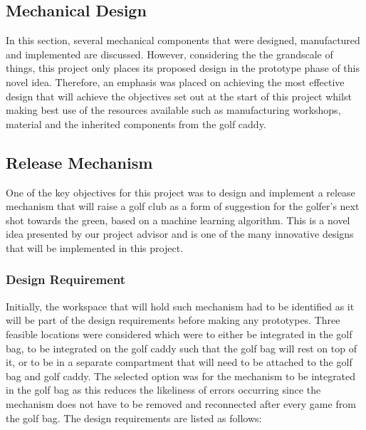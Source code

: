 \documentclass[11pt,landscape]{article}
\begin{document}
\begin{multicols}{2}


    \newpage
    
\section{Mechanical Design}
    In this section, several mechanical components that were designed,
    manufactured and implemented are discussed. However, considering the the
    grandscale of things, this project only places its proposed design in the
    prototype phase of this novel idea. Therefore, an emphasis was placed on
    achieving the most effective design that will achieve the objectives set out
    at the start of this project whilst making best use of the resources
    available such as manufacturing workshops, material and the inherited
    components from the golf caddy. 
    
    \subsection{Release Mechanism}
    One of the key objectives for this project was to design and implement a
    release mechanism that will raise a golf club as a form of suggestion for
    the golfer’s next shot towards the green, based on a machine learning
    algorithm. This is a novel idea presented by our project advisor and is one
    of the many innovative designs that will be implemented in this project.
    
    \subsubsection{Design Requirement}
    Initially, the workspace that will hold such mechanism had to be identified
    as it will be part of the design requirements before making any prototypes.
    Three feasible locations were considered which were to either be integrated
    in the golf bag, to be integrated on the golf caddy such that the golf bag
    will rest on top of it, or to be in a separate compartment that will need to
    be attached to the golf bag and golf caddy. The selected option was for the
    mechanism to be integrated in the golf bag as this reduces the likeliness of
    errors occurring since the mechanism does not have to be removed and
    reconnected after every game from the golf bag. The design requirements are
    listed as follows:
    

\end{multicols}
\end{document}
